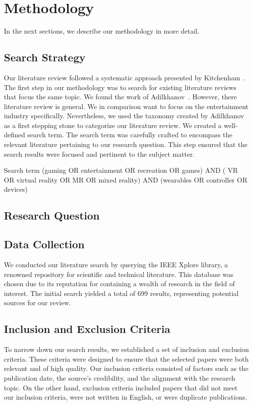 \section{Methodology}
\label{sec:method}
In the next sections, we describe our methodology in more detail.

\subsection{Search Strategy}

Our literature review followed a systematic approach presented by Kitchenham~\cite{Kitchenham06}. The first step in our methodology was to search for existing literature reviews that focus the same topic. We found the work of Adilkhanov~\cite{Adilkhanov22}. However, there literature review is general. We in comparison want to focus on the entertainment industry specifically. Nevertheless, we used the taxonomy created by Adilkhanov as a first stepping stone to categorize our literature review. We created a well-defined search term. The search term was carefully crafted to encompass the relevant literature pertaining to our research question. This step ensured that the search results were focused and pertinent to the subject matter.

Search term (gaming OR entertainment OR recreation OR games) AND ( VR OR virtual reality OR MR OR mixed reality) AND (wearables OR controller OR devices)


\subsection{Research Question}


\subsection{Data Collection}
We conducted our literature search by querying the IEEE Xplore library, a renowned repository for scientific and technical literature. This database was chosen due to its reputation for containing a wealth of research in the field of interest. The initial search yielded a total of 699 results, representing potential sources for our review.

\subsection{Inclusion and Exclusion Criteria}
To narrow down our search results, we established a set of inclusion and exclusion criteria. These criteria were designed to ensure that the selected papers were both relevant and of high quality. Our inclusion criteria consisted of factors such as the publication date, the source's credibility, and the alignment with the research topic. On the other hand, exclusion criteria included papers that did not meet our inclusion criteria, were not written in English, or were duplicate publications.


